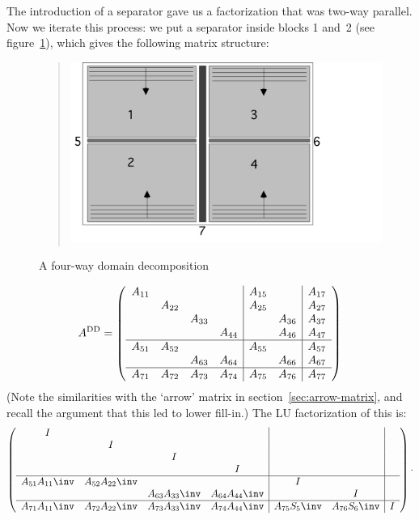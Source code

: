 The introduction of a separator gave us a factorization that was
two-way parallel. Now we iterate this process: we put a
separator inside blocks 1 and~2 (see figure~\ref{fig:domdecomp2}),
which gives the following matrix structure:
\begin{figure}[ht]
  \begin{quote}
    \includegraphics[scale=.11]{graphics/domdecomp2}
  \end{quote}
  \caption{A four-way domain decomposition}
  \label{fig:domdecomp2}
\end{figure}
\[
  A^{\mathrm{DD}}=
  \left(\begin{array}{cccc|cc|c}
    A_{11}&     &     &     &A_{15}&     &A_{17}\\
         &A_{22}&     &     &A_{25}&     &A_{27}\\
         &     &A_{33}&     &     &A_{36}&A_{37}\\
         &     &     &A_{44}&     &A_{46}&A_{47}\\ \hline
    A_{51}&A_{52}&    &     &A_{55}&      &A_{57}\\
         &      &A_{63}&A_{64}&    &A_{66}&A_{67}\\ \hline
    A_{71}&A_{72}&A_{73}&A_{74}&A_{75}&A_{76}&A_{77}
  \end{array}\right)
\]
(Note the similarities with the `arrow' matrix in
section~\ref{sec:arrow-matrix}, and recall the argument that this led
to lower fill-in.)
The LU factorization of this is:
\[
  \left(\begin{array}{cccc|cc|c}
        I&     &     &     &      &     &\\
         &I    &     &     &      &     &\\
         &     &I    &     &      &     &\\
         &     &     &I    &      &     &\\ \hline
    A_{51}A_{11}\inv&A_{52}A_{22}\inv&    &     &I    &      &\\
         &      &A_{63}A_{33}\inv&A_{64}A_{44}\inv&   &I     &\\ \hline
    A_{71}A_{11}\inv&A_{72}A_{22}\inv&A_{73}A_{33}\inv&A_{74}A_{44}\inv&
    A_{75}S_5\inv&A_{76}S_6\inv&I
  \end{array}\right) \cdot
\]
